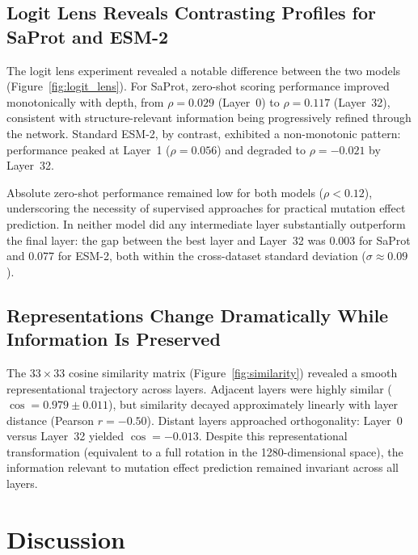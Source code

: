 \documentclass[11pt,a4paper]{article}
\begin{document}
\subsection{Logit Lens Reveals Contrasting Profiles for SaProt and ESM-2}

The logit lens experiment revealed a notable difference between the two models
(Figure~\ref{fig:logit_lens}). For SaProt, zero-shot scoring performance
improved monotonically with depth, from $\rho = 0.029$ (Layer~0) to $\rho = 0.117$
(Layer~32), consistent with structure-relevant information being progressively
refined through the network. Standard ESM-2, by contrast, exhibited a non-monotonic
pattern: performance peaked at Layer~1 ($\rho = 0.056$) and degraded to
$\rho = -0.021$ by Layer~32.

Absolute zero-shot performance remained low for both models ($\rho < 0.12$),
underscoring the necessity of supervised approaches for practical mutation effect
prediction. In neither model did any intermediate layer substantially outperform
the final layer: the gap between the best layer and Layer~32 was 0.003 for SaProt
and 0.077 for ESM-2, both within the cross-dataset standard deviation
($\sigma \approx 0.09$).

\subsection{Representations Change Dramatically While Information Is Preserved}

The $33 \times 33$ cosine similarity matrix (Figure~\ref{fig:similarity}) revealed
a smooth representational trajectory across layers. Adjacent layers were highly
similar ($\cos = 0.979 \pm 0.011$), but similarity decayed approximately linearly
with layer distance (Pearson $r = -0.50$). Distant layers approached orthogonality:
Layer~0 versus Layer~32 yielded $\cos = -0.013$. Despite this representational
transformation (equivalent to a full rotation in the 1280-dimensional space),
the information relevant to mutation effect prediction remained invariant across
all layers.

\section{Discussion}
\end{document}
